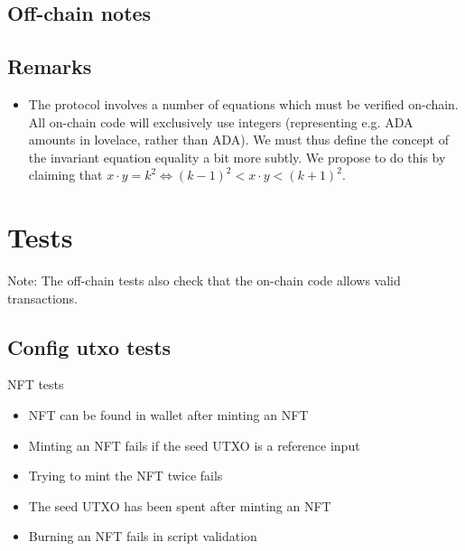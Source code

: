 \documentclass{article}
\begin{document}
\subsection{Off-chain notes}


\subsection{Remarks}

\begin{itemize}
  \item The protocol involves a number of equations which must be verified
    on-chain. All on-chain code will exclusively use integers (representing e.g.
    ADA amounts in lovelace, rather than ADA). We must thus define the concept
    of the invariant equation equality a bit more subtly. We propose to do this
    by claiming that $x \cdot y = k^2 \Leftrightarrow (k-1)^2 < x \cdot y <
    (k+1)^2$.
\end{itemize}


\section{Tests}


Note: The off-chain tests also check that the on-chain code allows valid
transactions.


\subsection{Config utxo tests}

NFT tests

\begin{itemize}
	\item NFT can be found in wallet after minting an NFT
	\item Minting an NFT fails if the seed UTXO is a reference input
	\item Trying to mint the NFT twice fails
	\item The seed UTXO has been spent after minting an NFT
	\item Burning an NFT fails in script validation
\end{itemize}
\end{document}
